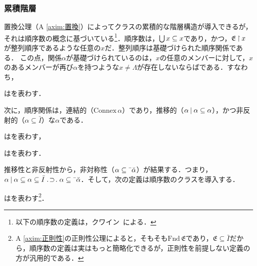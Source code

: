 \subsubsection{累積階層}
\label{sssec:累積階層}

置換公理（A \ref{axim:置換}）によってクラスの累積的な階層構造が導入できるが，それは順序数の概念に基づいている\footnote{以下の順序数の定義は，クワイン~\cite[pp.\,127--144]{クワインa}による．}．順序数は，$ {\textstyle\bigcup}\mspace{3mu}x\subseteq x $であり，かつ，$ \mathfrak{E}\mathbin{\upharpoonright} x $が整列順序であるような任意の$ x $だ．整列順序は基礎づけられた順序関係である．
この点，関係$\alpha$が基礎づけられているのは，$x$の任意のメンバーに対して，$x$のあるメンバーが再び$\alpha$を持つような$x\neq \Lambda$が存在しないならばである．すなわち，
\begin{df}
\label{df:基礎}
はを表わす．
\end{df}

\noindent 次に，順序関係は，連結的（$\mathrm{Connex}\,\alpha$）であり，推移的（$ \alpha\mathbin{\mid}\alpha\subseteq\alpha $），かつ非反射的（$\alpha\subseteq\bar{I}$）な$\alpha$である．

\begin{df}
\label{df:連結性}
はを表わす，
\end{df}

\begin{df}
\label{df:順序}
はを表わす．
\end{df}
\noindent 推移性と非反射性から，非対称性（$\alpha\subseteq\bar{\:\:}\breve{\alpha}$）が結果する．つまり，
$ \alpha\resl\alpha\subseteq\alpha\subseteq\bar{I}\case{1}{1}{1}\alpha\subseteq\barl{\breve{\alpha}} $．そして，次の定義は順序数のクラスを導入する．
\begin{df}
\label{df:順序数}
はを表わす\footnote{
    A \ref{axim:正則性}の正則性公理によると，そもそも$ \mathrm{Fnd}\,\mathfrak{E} $であり，$ \mathfrak{E}\subseteq\bar{I} $だから，順序数の定義は実はもっと簡略化できるが，正則性を前提しない定義の方が汎用的である．
}．
\end{df}

